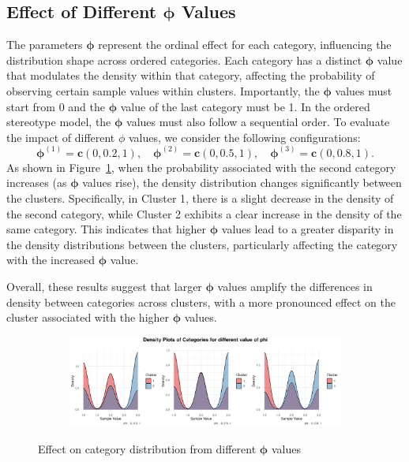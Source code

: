 \documentclass{article}
\begin{document}
\clearpage

\subsection{Effect of Different $\bm{\phi}$ Values}
The parameters $\bm{\phi}$ represent the ordinal effect for each category, influencing the distribution shape across ordered categories. Each category has a distinct $\bm{\phi}$ value that modulates the density within that category, affecting the probability of observing certain sample values within clusters.
Importantly, the $\bm{\phi}$ values must start from 0 and the $\bm{\phi}$ value of the last category must be 1. In the ordered stereotype model, the $\bm{\phi}$ values must also follow a sequential order. 
To evaluate the impact of different $\phi$ values, we consider the following configurations:
\[
\bm{\phi}^{(1)} = \mathbf{c}(0, 0.2, 1), \quad \bm{\phi}^{(2)} = \mathbf{c}(0, 0.5, 1), \quad \bm{\phi}^{(3)} = \mathbf{c}(0, 0.8, 1).
\]
As shown in Figure~\ref{fig:phi}, 
when the probability associated with the second category increases (as $\bm{\phi}$ values rise), 
the density distribution changes significantly between the clusters. 
Specifically, in Cluster 1, there is a slight decrease in the density of the second category, 
while Cluster 2 exhibits a clear increase in the density of the same category. 
This indicates that higher $\bm{\phi}$ values lead to a greater disparity 
in the density distributions between the clusters, 
particularly affecting the category with the increased $\bm{\phi}$ value.

Overall, these results suggest that larger $\bm{\phi}$ values amplify the differences in density between categories across clusters, 
with a more pronounced effect on the cluster associated with the higher $\bm{\phi}$ values.

\begin{figure}[htbp!]
  \centering
  \begin{subfigure}{1.0\textwidth}
      \centering
      \includegraphics[width=\textwidth]{images/para_sim/phi.png}
  \end{subfigure}
  \caption{Effect on category distribution from different $\bm{\phi}$ values}
  \label{fig:phi}
\end{figure}
\end{document}
